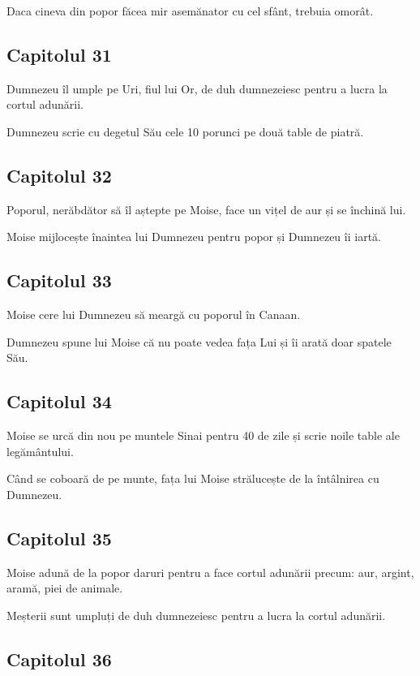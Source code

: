 \documentclass[12pt,a4paper]{article}
\begin{document}
Daca cineva din popor făcea mir asemănator cu cel sfânt, trebuia omorât.

\subsection{Capitolul 31}

Dumnezeu îl umple pe Uri, fiul lui Or, de duh dumnezeiesc pentru a lucra la cortul adunării.

Dumnezeu scrie cu degetul Său cele 10 porunci pe două table de piatră.

\subsection{Capitolul 32}

Poporul, nerăbdător să îl aștepte pe Moise, face un vițel de aur și se închină lui.

Moise mijlocește înaintea lui Dumnezeu pentru popor și Dumnezeu îi iartă.

\subsection{Capitolul 33}

Moise cere lui Dumnezeu să meargă cu poporul în Canaan.

Dumnezeu spune lui Moise că nu poate vedea fața Lui și îi arată doar spatele Său.

\subsection{Capitolul 34}

Moise se urcă din nou pe muntele Sinai pentru 40 de zile și scrie noile table ale legământului.

Când se coboară de pe munte, fața lui Moise strălucește de la întâlnirea cu Dumnezeu.

\subsection{Capitolul 35}

Moise adună de la popor daruri pentru a face cortul adunării precum: aur, argint, aramă, piei de animale.

Meșterii sunt umpluți de duh dumnezeiesc pentru a lucra la cortul adunării.

\subsection{Capitolul 36}
\end{document}
